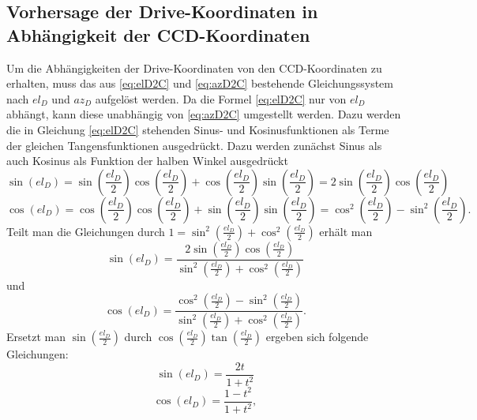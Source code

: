 \subsection{Vorhersage der Drive-Koordinaten in Abhängigkeit der CCD-Koordinaten}
Um die Abhängigkeiten der Drive-Koordinaten von den CCD-Koordinaten zu erhalten, muss das aus \ref{eq:elD2C} und \ref{eq:azD2C} bestehende Gleichungssystem nach $el_D$ und $az_D$ aufgelöst werden. Da die Formel \ref{eq:elD2C} nur von $el_D$ abhängt, kann diese unabhängig von \ref{eq:azD2C} umgestellt werden. Dazu werden die in Gleichung \ref{eq:elD2C} stehenden Sinus- und Kosinusfunktionen als Terme der gleichen Tangensfunktionen ausgedrückt. Dazu werden zunächst Sinus als auch Kosinus als Funktion der halben Winkel ausgedrückt
\begin{equation}
\sin\left( el_D \right) = \sin\left( \frac{el_D}{2} \right)\cos\left( \frac{el_D}{2} \right)+\cos\left( \frac{el_D}{2} \right)\sin\left( \frac{el_D}{2} \right)=2\sin\left( \frac{el_D}{2} \right)\cos\left( \frac{el_D}{2} \right)
\end{equation}
\begin{equation}
\cos\left( el_D \right) = \cos\left( \frac{el_D}{2} \right)\cos\left( \frac{el_D}{2} \right)+\sin\left( \frac{el_D}{2} \right)\sin\left( \frac{el_D}{2} \right)=\cos^2\left( \frac{el_D}{2} \right)-\sin^2\left( \frac{el_D}{2} \right).
\end{equation}
Teilt man die Gleichungen durch $1=\sin^2\left( \frac{el_D}{2} \right)+\cos^2\left( \frac{el_D}{2} \right)$ erhält man
\begin{equation}
\sin\left( el_D \right)=\frac{2\sin\left( \frac{el_D}{2} \right)\cos\left( \frac{el_D}{2} \right)}{\sin^2\left( \frac{el_D}{2} \right)+\cos^2\left( \frac{el_D}{2} \right)}
\end{equation}
und
\begin{equation}
\cos\left( el_D \right)=\frac{\cos^2\left( \frac{el_D}{2} \right)-\sin^2\left( \frac{el_D}{2} \right)}{\sin^2\left( \frac{el_D}{2} \right)+\cos^2\left( \frac{el_D}{2} \right)}.
\end{equation}
Ersetzt man $\sin\left(\frac{el_D}{2}\right)$ durch $\cos\left(\frac{el_D}{2}\right)\tan\left(\frac{el_D}{2}\right)$ ergeben sich folgende Gleichungen:
\begin{equation}
\sin\left(el_D\right)=\frac{2t}{1+t^2}
\label{eq:sint}
\end{equation}
\begin{equation}
\cos\left(el_D\right)=\frac{1-t^2}{1+t^2},
\label{eq:cost}
\end{equation}
